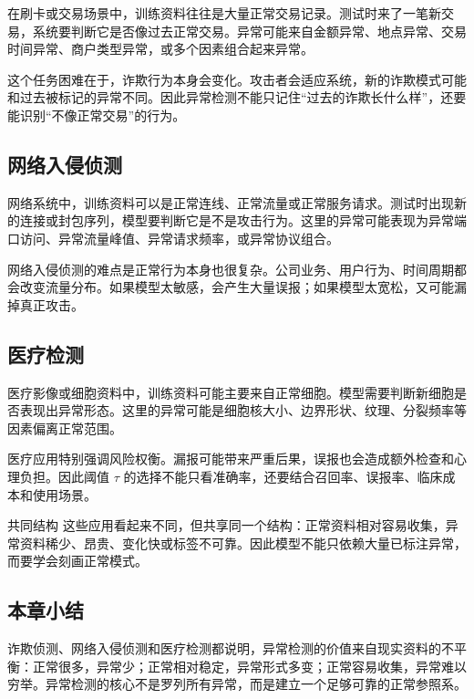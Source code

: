 \documentclass[a4paper]{article}
\begin{document}
在刷卡或交易场景中，训练资料往往是大量正常交易记录。测试时来了一笔新交易，系统要判断它是否像过去正常交易。异常可能来自金额异常、地点异常、交易时间异常、商户类型异常，或多个因素组合起来异常。

这个任务困难在于，诈欺行为本身会变化。攻击者会适应系统，新的诈欺模式可能和过去被标记的异常不同。因此异常检测不能只记住“过去的诈欺长什么样”，还要能识别“不像正常交易”的行为。

\subsection{网络入侵侦测}

网络系统中，训练资料可以是正常连线、正常流量或正常服务请求。测试时出现新的连接或封包序列，模型要判断它是不是攻击行为。这里的异常可能表现为异常端口访问、异常流量峰值、异常请求频率，或异常协议组合。

网络入侵侦测的难点是正常行为本身也很复杂。公司业务、用户行为、时间周期都会改变流量分布。如果模型太敏感，会产生大量误报；如果模型太宽松，又可能漏掉真正攻击。

\subsection{医疗检测}

医疗影像或细胞资料中，训练资料可能主要来自正常细胞。模型需要判断新细胞是否表现出异常形态。这里的异常可能是细胞核大小、边界形状、纹理、分裂频率等因素偏离正常范围。

医疗应用特别强调风险权衡。漏报可能带来严重后果，误报也会造成额外检查和心理负担。因此阈值 $\tau$ 的选择不能只看准确率，还要结合召回率、误报率、临床成本和使用场景。

\begin{importantbox}{共同结构}
    这些应用看起来不同，但共享同一个结构：正常资料相对容易收集，异常资料稀少、昂贵、变化快或标签不可靠。因此模型不能只依赖大量已标注异常，而要学会刻画正常模式。
\end{importantbox}

\subsection{本章小结}

诈欺侦测、网络入侵侦测和医疗检测都说明，异常检测的价值来自现实资料的不平衡：正常很多，异常少；正常相对稳定，异常形式多变；正常容易收集，异常难以穷举。异常检测的核心不是罗列所有异常，而是建立一个足够可靠的正常参照系。

\end{document}
